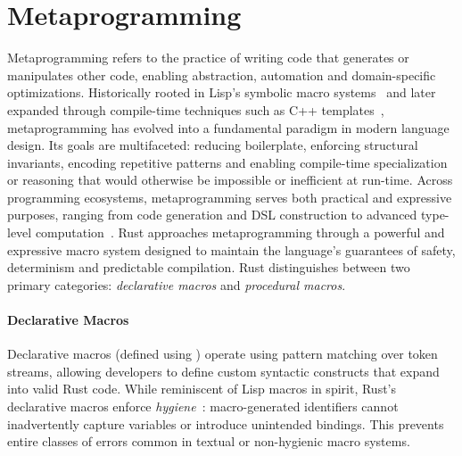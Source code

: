 \section{Metaprogramming}\label{sec:metaprogramming}
Metaprogramming refers to the practice of writing code that generates or manipulates other code, enabling abstraction, automation and domain-specific optimizations.
Historically rooted in Lisp's symbolic macro systems~\cite{McCarthy60} and later expanded through compile-time techniques such as C++ templates~\cite{Vandevoorde02}, metaprogramming has evolved into a fundamental paradigm in modern language design.
Its goals are multifaceted: reducing boilerplate, enforcing structural invariants, encoding repetitive patterns and enabling compile-time specialization or reasoning that would otherwise be impossible or inefficient at run-time.
Across programming ecosystems, metaprogramming serves both practical and expressive purposes, ranging from code generation and DSL construction to advanced type-level computation~\cite{DSLMetaProgramming08, MetaprogrammingUr10}.
Rust approaches metaprogramming through a powerful and expressive macro system designed to maintain the language's guarantees of safety, determinism and predictable compilation.
Rust distinguishes between two primary categories: \textit{declarative macros} and \textit{procedural macros}.

\paragraph{Declarative Macros}
Declarative macros (defined using ) operate using pattern matching over token streams, allowing developers to define custom syntactic constructs that expand into valid Rust code.
While reminiscent of Lisp macros in spirit, Rust's declarative macros enforce \textit{hygiene}~\cite{HygienicMacros92,Kohlbecker1986HygienicME,Clinger2020HygienicMT}: macro-generated identifiers cannot inadvertently capture variables or introduce unintended bindings.
This prevents entire classes of errors common in textual or non-hygienic macro systems.

